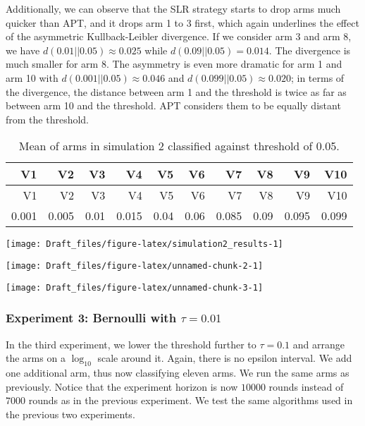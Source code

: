 \documentclass[12pt,]{article}
\begin{document}
Additionally, we can observe that the SLR strategy starts to drop arms
much quicker than APT, and it drops arm 1 to 3 first, which again
underlines the effect of the asymmetric Kullback-Leibler divergence. If
we consider arm 3 and arm 8, we have \(d(0.01||0.05) \approx 0.025\)
while \(d(0.09||0.05) = 0.014\). The divergence is much smaller for arm
8. The asymmetry is even more dramatic for arm 1 and arm 10 with
\(d(0.001||0.05) \approx 0.046\) and \(d(0.099||0.05) \approx 0.020\);
in terms of the divergence, the distance between arm 1 and the threshold
is twice as far as between arm 10 and the threshold. APT considers them
to be equally distant from the threshold.

\begin{longtable}[]{@{}rrrrrrrrrr@{}}
\caption{Mean of arms in simulation 2 classified against threshold of
0.05.}\tabularnewline
\toprule
V1 & V2 & V3 & V4 & V5 & V6 & V7 & V8 & V9 & V10\tabularnewline
\midrule
\endfirsthead
\toprule
V1 & V2 & V3 & V4 & V5 & V6 & V7 & V8 & V9 & V10\tabularnewline
\midrule
\endhead
0.001 & 0.005 & 0.01 & 0.015 & 0.04 & 0.06 & 0.085 & 0.09 & 0.095 &
0.099\tabularnewline
\bottomrule
\end{longtable}

\begin{center}\texttt{[image: Draft\_files/figure-latex/simulation2\_results-1]} \end{center}

\begin{center}\texttt{[image: Draft\_files/figure-latex/unnamed-chunk-2-1]} \end{center}

\begin{center}\texttt{[image: Draft\_files/figure-latex/unnamed-chunk-3-1]} \end{center}

\subsubsection{\texorpdfstring{Experiment 3: Bernoulli with
\(\tau = 0.01\)}{Experiment 3: Bernoulli with \textbackslash{}tau = 0.01}}\label{experiment-3-bernoulli-with-tau-0.01}

In the third experiment, we lower the threshold further to
\(\tau = 0.1\) and arrange the arms on a \(\log_{10}\) scale around it.
Again, there is no epsilon interval. We add one additional arm, thus now
classifying eleven arms. We run the same arms as previously. Notice that
the experiment horizon is now \(10000\) rounds instead of \(7000\)
rounds as in the previous experiment. We test the same algorithms used
in the previous two experiments.
\end{document}
